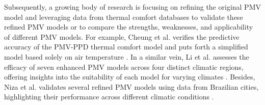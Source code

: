 \documentclass[final,3p,times,12pt]{elsarticle}
\begin{document}
Subsequently, a growing body of research is focusing on refining the original PMV model and leveraging data from thermal comfort databases to validate these refined PMV models or to compare the strengths, weaknesses, and applicability of different PMV models. For example, Cheung et al. verifies the predictive accuracy of the PMV-PPD thermal comfort model and puts forth a simplified model based solely on air temperature \cite{cheungAnalysisAccuracyPMV2019}. In a similar vein, Li et al. assesses the efficacy of seven enhanced PMV models across four distinct climatic regions, offering insights into the suitability of each model for varying climates \cite{liModifiedPredictedMean2025}. Besides, Niza et al. validates several refined PMV models using data from Brazilian cities, highlighting their performance across different climatic conditions \cite{lourenconizaThermalComfortConditions2022}.
\end{document}

